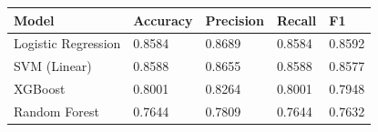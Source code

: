\begin{tabular}{lllll}
\toprule
Model & Accuracy & Precision & Recall & F1 \\
\midrule
Logistic Regression & 0.8584 & 0.8689 & 0.8584 & 0.8592 \\
SVM (Linear) & 0.8588 & 0.8655 & 0.8588 & 0.8577 \\
XGBoost & 0.8001 & 0.8264 & 0.8001 & 0.7948 \\
Random Forest & 0.7644 & 0.7809 & 0.7644 & 0.7632 \\
\bottomrule
\end{tabular}
